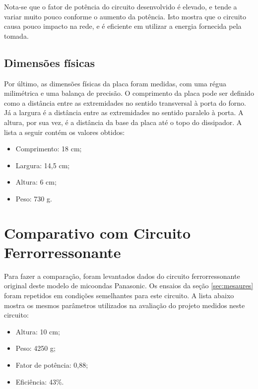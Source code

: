 Nota-se que o fator de potência do circuito desenvolvido é elevado, e tende a variar muito pouco conforme o aumento da potência. Isto mostra que o circuito causa pouco impacto na rede, e é eficiente em utilizar a energia fornecida pela tomada.


\subsection{Dimensões físicas}
Por último, as dimensões físicas da placa foram medidas, com uma régua milimétrica e uma balança de precisão. O comprimento da placa pode ser definido como a distância entre as extremidades no sentido transversal à porta do forno. Já a largura é a distância entre as extremidades no sentido paralelo à porta. A altura, por sua vez, é a distância da base da placa até o topo do dissipador. A lista a seguir contém os valores obtidos:

\bigskip
\begin{itemize}
    \item Comprimento: 18 cm;
    \item Largura: 14,5 cm;
    \item Altura: 6 cm;
    \item Peso: 730 g.
\end{itemize}
\bigskip

\section{Comparativo com Circuito Ferrorressonante}

Para fazer a comparação, foram levantados dados do circuito ferrorressonante original deste modelo de micoondas Panasonic. Os ensaios da seção \ref{sec:mesaures} foram repetidos em condições semelhantes para este circuito.  A lista abaixo mostra os mesmos parâmetros utilizados na avaliação do projeto medidos neste circuito: 

\bigskip
\begin{itemize}
    \item Altura: 10 cm;
    \item Peso: 4250 g;
    \item Fator de potência: 0,88;
    \item Eficiência: 43\%.
\end{itemize}
\bigskip

